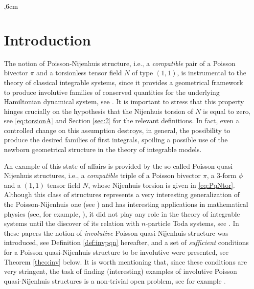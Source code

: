 \documentclass[12pt]{article}
\begin{document}
,6cm

\section{Introduction}

The notion of Poisson-Nijenhuis structure, i.e., a \emph{compatible} pair of a Poisson bivector $\pi$ and a 
torsionless tensor field $N$ of type $(1,1)$, is instrumental to the theory of classical integrable systems, since it provides a geometrical framework to produce involutive  families of conserved quantities for the underlying Hamiltonian dynamical system, see \cite{KM, Magri-Morosi}. It is important to stress that this property hinges crucially on the hypothesis that the Nijenhuis torsion of $N$ is equal to zero, see \eqref{eq:torsionA} and Section \ref{sec:2} for the relevant definitions. In fact, even a controlled change on this assumption destroys, in general, the possibility to produce the desired families of first integrals, spoiling a possible use of the newborn geometrical structure in the theory of integrable models.

An example of this state of affairs is provided by the so called Poisson quasi-Nijenhuis structures, i.e., a \emph{compatible} triple of a Poisson bivector $\pi$, a 3-form $\phi$ and a $(1,1)$ tensor field $N$, whose Nijenhuis torsion is given in  \eqref{eq:PqNtor}. %
Although this class of structures represents a very interesting generalization of the Poisson-Nijenhuis one (see \cite{SX, Antunes2008, C-NdC-2010, BursztynDrummondNetto2021, DMP2024}) and has interesting applications in mathematical physics 
(see, for example, \cite{Zucchini}), it did not play any role in the theory of integrable systems until the discover 
of its relation with 
$n$-particle Toda systems, see \cite{FMOP2020,FMP2024}. In these papers the notion of \emph{involutive} Poisson quasi-Nijenhuis structure was introduced, see Definition \ref{def:invpqn} hereafter, and a set of \emph{sufficient} conditions for a Poisson quasi-Nijenhuis structure to be involutive were presented, see Theorem \ref{theo:inv} below. It is worth mentioning that, since these conditions are very stringent, the task of finding (interesting) examples of involutive Poisson quasi-Nijenhuis structures is a non-trivial open problem, see for example \cite{FMP2023}.
\end{document}
